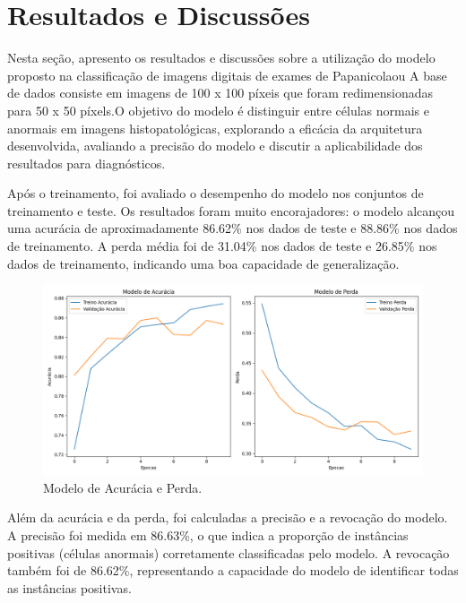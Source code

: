 \chapter{Resultados e Discussões}\label{chapter:resultados}

Nesta seção, apresento os resultados e discussões sobre a utilização do modelo proposto na classificação de imagens digitais de exames de Papanicolaou A base de dados consiste em imagens de 100 x 100 píxeis que foram redimensionadas para 50 x 50 píxels.O objetivo do modelo é distinguir entre células normais e anormais em imagens histopatológicas, explorando a eficácia da arquitetura desenvolvida, avaliando a precisão do modelo e discutir a aplicabilidade dos resultados para diagnósticos.

Após o treinamento, foi avaliado o desempenho do modelo nos conjuntos de treinamento e teste. Os resultados foram muito encorajadores: o modelo alcançou uma acurácia de aproximadamente 86.62\% nos dados de teste e 88.86\% nos dados de treinamento. A perda média foi de 31.04\% nos dados de teste e 26.85\% nos dados de treinamento, indicando uma boa capacidade de generalização.

\begin{figure}[H]
    \centering
    \includegraphics[width=1.0\textwidth]{figuras/modelos.png}
    \caption{Modelo de Acurácia e Perda.}
    \label{fig:nome_da_imagem}
\end{figure}

Além da acurácia e da perda, foi calculadas a precisão e a revocação do modelo. A precisão foi medida em 86.63\%, o que indica a proporção de instâncias positivas (células anormais) corretamente classificadas pelo modelo. A revocação também foi de 86.62\%, representando a capacidade do modelo de identificar todas as instâncias positivas.

